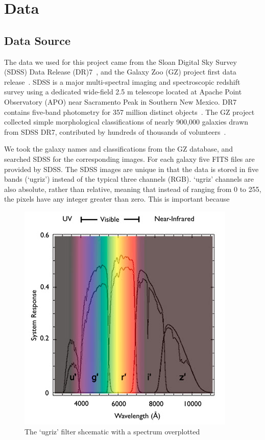 \section{Data}
\label{sec:data}
\subsection{Data Source}
\label{sec:data_source}
The data we used for this project came from the Sloan Digital Sky Survey (SDSS) Data Release (DR)7~\cite{abazajian2009seventh}, and the Galaxy Zoo (GZ) project first data release~\cite{lintott2010galaxy}. 
SDSS is a major multi-spectral imaging and spectroscopic redshift survey using a dedicated wide-field 2.5 m telescope located at Apache Point Observatory (APO) near Sacramento Peak in Southern New Mexico.
DR7 contains five-band photometry for 357 million distinct objects~\cite{abazajian2009seventh}. 
The GZ project collected simple morphological classifications of nearly 900,000 galaxies drawn from SDSS DR7, contributed by hundreds of thousands of volunteers~\cite{lintott2010galaxy}. 

We took the galaxy names and classifications from the GZ database, and searched SDSS for the corresponding images. For each galaxy five FITS files are provided by SDSS.
The SDSS images are unique in that the data is stored in five bands (`ugriz') instead of the typical three channels (RGB). 
`ugriz' channels are also absolute, rather than relative, meaning that instead of ranging from 0 to 255, the pixels have any integer greater than zero. 
This is important because 


\begin{figure}[h!]
	\centering
	\captionsetup{justification=centering}
	\includegraphics[scale=0.5]{Figures/filters.jpg}
	\caption{The `ugriz' filter shcematic with a spectrum overplotted}
	\label{fig:filters}
\end{figure}



